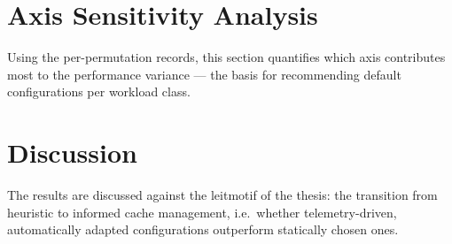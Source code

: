 % 

\section{Axis Sensitivity Analysis}\label{sec:sensitivity}

Using the per-permutation records, this section quantifies which axis contributes most to
the performance variance --- the basis for recommending default configurations per
workload class.

\section{Discussion}\label{sec:discussion}

The results are discussed against the leitmotif of the thesis: the transition from
heuristic to informed cache management, i.e.\ whether telemetry-driven, automatically
adapted configurations outperform statically chosen ones.
